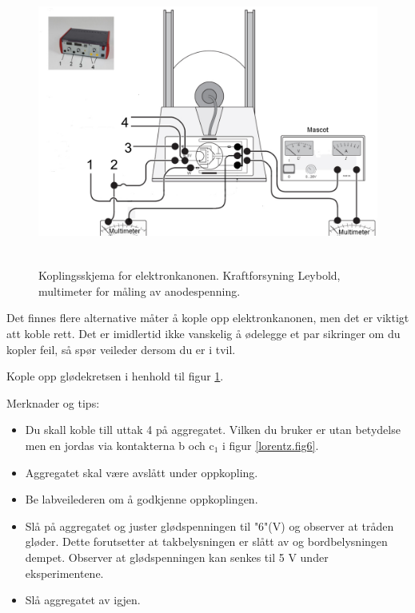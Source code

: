 \documentclass[../Elmag-labhefte-2020.tex]{subfiles}
\begin{document}
\begin{figure}[!ht]
    \centering
    \includegraphics[width=14cm,height=9.49cm,keepaspectratio]{fig/Lorentz03-New.pdf}
    \caption{%
        Koplingsskjema for elektronkanonen. Kraftforsyning Leybold, multimeter for måling av anodespenning.
    }
    \label{lorentz.fig7}
\end{figure}

Det finnes flere alternative måter å kople opp elektronkanonen, men det er viktigt att koble rett. Det er imidlertid ikke vanskelig å ødelegge et par sikringer om du kopler feil, så spør veileder dersom du er i tvil.

{\itsf Kople opp glødekretsen i henhold til figur \ref{lorentz.fig7}.}

Merknader og tips:
\vspace{-4mm} 
\begin{itemize}
    \item Du skall koble till uttak 4 på aggregatet. Vilken du bruker er utan betydelse men en jordas via kontakterna b och c$_1$ i figur \ref{lorentz.fig6}.
    \item Aggregatet skal være avslått under oppkopling. 
    \item Be labveilederen om å godkjenne oppkoplingen.
    \item Slå på aggregatet og juster glødspenningen til "6"(V) og observer at tråden gløder. Dette forutsetter at takbelysningen er slått av og bordbelysningen dempet. Observer at glødspenningen kan senkes til 5 V under eksperimentene.
    \item Slå aggregatet av igjen.
\end{itemize}
\end{document}
